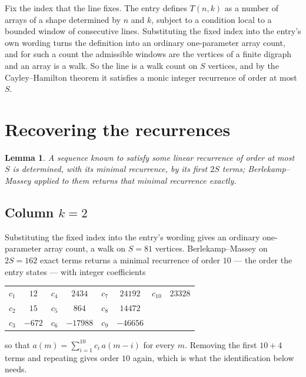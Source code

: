 \documentclass[11pt,a4paper]{article}
\theoremstyle{plain}
\newtheorem{lemma}[theorem]{Lemma}
\theoremstyle{definition}
\begin{document}
Fix the index that the line fixes. The entry defines $T(n,k)$ as a number of arrays of a shape
determined by $n$ and $k$, subject to a condition local to a bounded window of consecutive
lines. Substituting the fixed index into the entry's own wording turns the definition into an
ordinary one-parameter array count, and for such a count the admissible windows are the
vertices of a finite digraph and an array is a walk. So the line is a walk count on $S$
vertices, and by the Cayley--Hamilton theorem it satisfies a monic integer recurrence of order
at most $S$.

\section{Recovering the recurrences}

\begin{lemma}\label{lem:bm}
A sequence known to satisfy some linear recurrence of order at most $S$ is determined, with its
minimal recurrence, by its first $2S$ terms; Berlekamp--Massey applied to them returns that
minimal recurrence exactly.
\end{lemma}

\subsection*{Column $k=2$}
Substituting the fixed index into the entry's wording gives an ordinary one-parameter array
count, a walk on $S=81$ vertices. Berlekamp--Massey on $2S=162$ exact terms
returns a minimal recurrence of order $10$ --- the order the entry states --- with
integer coefficients
\begin{center}\small\begin{tabular}{cccccccc}
$c_{1}$ & $12$ & $c_{4}$ & $2434$ & $c_{7}$ & $24192$ & $c_{10}$ & $23328$ \\
$c_{2}$ & $15$ & $c_{5}$ & $864$ & $c_{8}$ & $14472$ &  &  \\
$c_{3}$ & $-672$ & $c_{6}$ & $-17988$ & $c_{9}$ & $-46656$ &  &  \\
\end{tabular}\end{center}
so that $a(m)=\sum_{i=1}^{10}c_i\,a(m-i)$ for every $m$. Removing the first
$10+4$ terms and repeating gives order $10$ again, which is what the
identification below needs.
\end{document}
